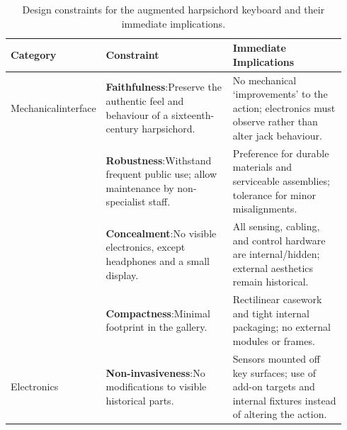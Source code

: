 \clearpage
\begin{table}
	\centering
	\caption[Design constraints]{Design constraints for the augmented harpsichord keyboard and their immediate implications.}
	\label{tab:design-constraints}
    {
    \renewcommand{\arraystretch}{1.75}
    \begin{tabular}{>{\raggedright\arraybackslash}p{0.14\linewidth}>{\raggedright\arraybackslash}p{0.4\linewidth}>{\raggedright\arraybackslash}p{0.4\linewidth}}
		\hline
		\textbf{Category} & \textbf{Constraint}                                                                                          & \textbf{Immediate Implications}                                                                                    \\
		\hline
        Mechanical\newline interface
		                  & \textbf{Faithfulness}:\newline Preserve the authentic feel and behaviour of a sixteenth-century harpsichord. & No mechanical `improvements' to the action; electronics must observe rather than alter jack behaviour.           \\[2.0ex]
		\cline{2-3}
		                  & \textbf{Robustness}:\newline Withstand frequent public use; allow maintenance by non-specialist staff.       & Preference for durable materials and serviceable assemblies; tolerance for minor misalignments.                    \\
		\cline{2-3}
		                  & \textbf{Concealment}:\newline No visible electronics, except headphones and a small display.                 & All sensing, cabling, and control hardware are internal/hidden; external aesthetics remain historical.             \\
		\cline{2-3}
		                  & \textbf{Compactness}:\newline Minimal footprint in the gallery.                                              & Rectilinear casework and tight internal packaging; no external modules or frames.                                  \\
		\hline
        Electronics
		                  & \textbf{Non-invasiveness}:\newline No modifications to visible historical parts.                             & Sensors mounted off key surfaces; use of add-on targets and internal fixtures instead of altering the action.      \\

\end{tabular}}
\end{table}
